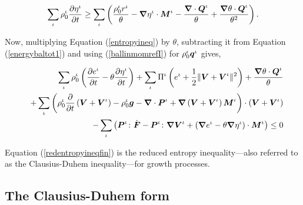 \begin{equation}
\sum\limits_{\iota}\rho_0^\iota\frac{\partial\eta^\iota}{\partial
t} \geq \sum\limits_{\iota}\left(\frac{\rho_0^\iota
r^\iota}{\theta} -\mbox{\boldmath$\nabla$}\eta^\iota\cdot\mbox{\boldmath$ M$}^\iota -
\frac{\mbox{\boldmath$\nabla$}\cdot\mbox{\boldmath$ Q$}^\iota}{\theta} +
\frac{\mbox{\boldmath$\nabla$}\theta\cdot\mbox{\boldmath$ Q$}^\iota}{\theta^2}\right).
\label{entropyineq}
\end{equation}

Now, multiplying Equation (\ref{entropyineq}) by $\theta$,
subtracting it from Equation (\ref{energybaltot1}) and using
(\ref{ballinmomrefI}) for $\rho_0^\iota\mbox{\boldmath$ q$}^\iota$ gives,

\begin{eqnarray}
& &\sum\limits_{\iota}\rho^\iota_0\left(\frac{\partial
e^\iota}{\partial t} -\theta\frac{\partial\eta^\iota}{\partial
t}\right) +\sum\limits_{\iota}\Pi^\iota\left(e^\iota +
\frac{1}{2}\Vert\mbox{\boldmath$ V$}+\mbox{\boldmath$ V$}^\iota\Vert^2\right) +
\frac{\mbox{\boldmath$\nabla$}\theta\cdot\mbox{\boldmath$ Q$}^\iota}{\theta}
\nonumber\\
& &+\sum\limits_{\iota} \left(\rho^\iota_0\frac{\partial}{\partial
t}\left(\mbox{\boldmath$ V$}+\mbox{\boldmath$ V$}^\iota\right) - \rho_0^\iota\mbox{\boldmath$ g$} -
\mbox{\boldmath$\nabla$}\cdot\mbox{\boldmath$ P$}^\iota +
\mbox{\boldmath$\nabla$}\left(\mbox{\boldmath$ V$}+\mbox{\boldmath$ V$}^\iota\right)\mbox{\boldmath$ M$}^\iota\right)
\cdot\left(\mbox{\boldmath$ V$}+\mbox{\boldmath$ V$}^\iota\right) \nonumber\\
& &-\sum\limits_{\iota}\left(\mbox{\boldmath$ P$}^\iota\colon\dot{\mbox{\boldmath$ F$}} -
\mbox{\boldmath$ P$}^\iota\colon\mbox{\boldmath$\nabla$}\mbox{\boldmath$ V$}^\iota + \left(\mbox{\boldmath$\nabla$} e^\iota -
\theta\mbox{\boldmath$\nabla$}\eta^\iota\right) \cdot\mbox{\boldmath$ M$}^\iota\right)\leq 0
\label{redentropyineqfin}
\end{eqnarray}

\noindent Equation (\ref{redentropyineqfin}) is the reduced
entropy inequality---also referred to as the Clausius-Duhem
inequality---for growth processes.

\subsection{The Clausius-Duhem form}
\label{clausius-duhem-form}


